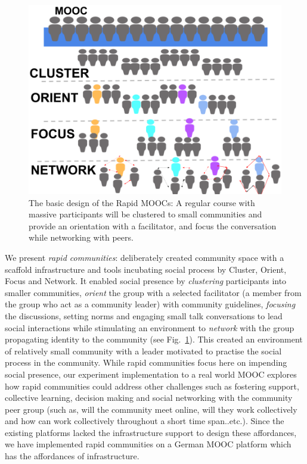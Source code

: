 \documentclass[manuscript,screen,review]{acmart}
\begin{document}
\begin{figure}[h]
  \centering
  \includegraphics[width=\linewidth]{images/Framework.png}
  \caption{The basic design of the Rapid MOOCs: A regular course with massive participants will be clustered to small communities and provide an orientation with a facilitator, and focus the conversation while networking with peers.}
 \label{fig:framework}
\end{figure}

We present \textit{rapid communities}: deliberately created community space with a scaffold infrastructure and tools incubating social process by Cluster, Orient, Focus and Network. It enabled social presence by \textit{clustering} participants into smaller communities, \textit{orient} the group with a selected facilitator (a member from the group who act as a community leader) with community guidelines, \textit{focusing} the discussions, setting norms and engaging small talk conversations to lead social interactions while stimulating an environment to \textit{network} with the group propagating identity to the community (see Fig.~\ref{fig:framework}). This created an environment of relatively small community with a leader motivated to practise the social process in the community. While rapid communities focus here on impending social presence, our experiment implementation to a real world MOOC explores how rapid communities could address other challenges such as fostering support, collective learning, decision making and social networking with the community peer group (such as,  will the community meet online, will they work collectively and how can work collectively throughout a short time span..etc.). Since the existing platforms lacked the infrastructure support to design these affordances, we have implemented rapid communities on a German MOOC platform which has the affordances of infrastructure.
\end{document}
